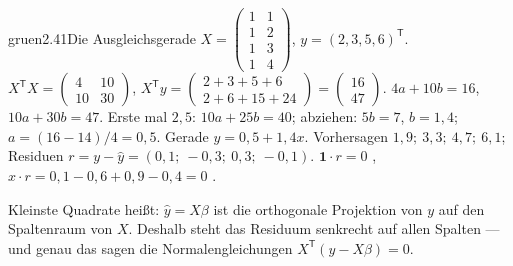 \begin{loesungkarte}{gruen}{2.41}{Die Ausgleichsgerade}
$X = \begin{pmatrix}1 & 1\\ 1 & 2\\ 1 & 3\\ 1 & 4\end{pmatrix}$, $y = (2, 3, 5, 6)^{\mathsf T}$. $X^{\mathsf T}X = \begin{pmatrix}4 & 10\\ 10 & 30\end{pmatrix}$, $X^{\mathsf T}y = \begin{pmatrix}2 + 3 + 5 + 6\\ 2 + 6 + 15 + 24\end{pmatrix} = \begin{pmatrix}16\\ 47\end{pmatrix}$.
$4a + 10b = 16$, $10a + 30b = 47$. Erste mal $2{,}5$: $10a + 25b = 40$; abziehen: $5b = 7$, $b = 1{,}4$; $a = (16 - 14)/4 = 0{,}5$. Gerade $y = 0{,}5 + 1{,}4x$.
Vorhersagen $1{,}9;\ 3{,}3;\ 4{,}7;\ 6{,}1$; Residuen $r = y - \hat y = (0{,}1;\ -0{,}3;\ 0{,}3;\ -0{,}1)$. $\mathbf 1\cdot r = 0$ \checkmark, $x\cdot r = 0{,}1 - 0{,}6 + 0{,}9 - 0{,}4 = 0$ \checkmark.
\begin{mitnehmen}\kastentext
Kleinste Quadrate heißt: $\hat y = X\beta$ ist die orthogonale Projektion von $y$ auf den Spaltenraum von $X$. Deshalb steht das Residuum senkrecht auf allen Spalten --- und genau das sagen die Normalengleichungen $X^{\mathsf T}(y - X\beta) = 0$.
\end{mitnehmen}
\end{loesungkarte}

